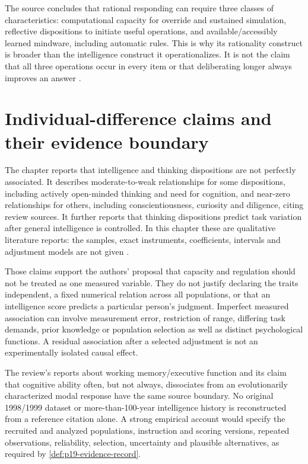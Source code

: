 The source concludes that rational responding can require three classes
of characteristics: computational capacity for override and sustained
simulation, reflective dispositions to initiate useful operations, and
available/accessibly learned mindware, including automatic rules. This is
why its rationality construct is broader than the intelligence construct
it operationalizes. It is not the claim that all three operations occur
in every item or that deliberating longer always improves an answer
\cite[pp.~796--798, fig.~15.2.4]{StanovichToplakWest2021Intelligence}.

\section{Individual-difference claims and their evidence boundary}
\label{sec:p19-rat152-evidence}

The chapter reports that intelligence and thinking dispositions are not
perfectly associated. It describes moderate-to-weak relationships for some
dispositions, including actively open-minded thinking and need for cognition,
and near-zero relationships for others, including conscientiousness,
curiosity and diligence, citing review sources. It further reports that
thinking dispositions predict task variation after general intelligence
is controlled. In this chapter these are qualitative literature reports:
the samples, exact instruments, coefficients, intervals and adjustment
models are not given \cite[sec.~5, p.~795]{StanovichToplakWest2021Intelligence}.

Those claims support the authors' proposal that capacity and regulation
should not be treated as one measured variable. They do not justify
declaring the traits independent, a fixed numerical relation across all
populations, or that an intelligence score predicts a particular person's
judgment. Imperfect measured association can involve measurement error,
restriction of range, differing task demands, prior knowledge or population
selection as well as distinct psychological functions. A residual association
after a selected adjustment is not an experimentally isolated causal effect.

The review's reports about working memory/executive function and its claim
that cognitive ability often, but not always, dissociates from an
evolutionarily characterized modal response have the same source boundary.
No original 1998/1999 dataset or more-than-100-year intelligence history
is reconstructed from a reference citation alone. A strong empirical account
would specify the recruited and analyzed populations, instruction and
scoring versions, repeated observations, reliability, selection, uncertainty
and plausible alternatives, as required by \cref{def:p19-evidence-record}.

